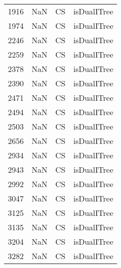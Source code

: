 \begin{tabular}{llll}
1916 &                   NaN &                         CS &                               isDualITree \\
1974 &                   NaN &                         CS &                               isDualITree \\
2246 &                   NaN &                         CS &                               isDualITree \\
2259 &                   NaN &                         CS &                               isDualITree \\
2378 &                   NaN &                         CS &                               isDualITree \\
2390 &                   NaN &                         CS &                               isDualITree \\
2471 &                   NaN &                         CS &                               isDualITree \\
2494 &                   NaN &                         CS &                               isDualITree \\
2503 &                   NaN &                         CS &                               isDualITree \\
2656 &                   NaN &                         CS &                               isDualITree \\
2934 &                   NaN &                         CS &                               isDualITree \\
2943 &                   NaN &                         CS &                               isDualITree \\
2992 &                   NaN &                         CS &                               isDualITree \\
3047 &                   NaN &                         CS &                               isDualITree \\
3125 &                   NaN &                         CS &                               isDualITree \\
3135 &                   NaN &                         CS &                               isDualITree \\
3204 &                   NaN &                         CS &                               isDualITree \\
3282 &                   NaN &                         CS &                               isDualITree \\

\end{tabular}
